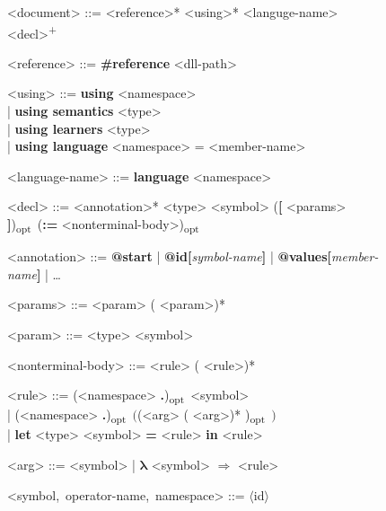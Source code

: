 \begin{figure}[p!]
    \begin{fullpage}
        \uwsinglespace
        \centering
        \newcommand{\onep}{\textsuperscript{+}}
        \newcommand{\optional}{\textsubscript{\textsf{opt}}\ }
        \renewcommand{\synt}[1]{\textsl{#1}}
        \renewcommand{\syntleft}{\slshape}
        \renewcommand{\syntright}{}
        \begin{tcolorbox}
            \begin{grammar}
                \parskip=3pt
                <document> ::= <reference>* <using>* <languge-name> <decl>\onep

                <reference> ::= \textbf{\#reference} <dll-path> \pmb{;}

                <using> ::= \textbf{using} <namespace> \pmb{;} \\
                | \textbf{using semantics} <type> \pmb{;} \\
                | \textbf{using learners} <type> \pmb{;} \\
                | \textbf{using language} <namespace> = <member-name> \pmb{;}

                <language-name> ::= \textbf{language} <namespace> \pmb{;}

                <decl> ::= <annotation>* <type> <symbol> (\textbf{[} <params> \textbf{]})\optional (\textbf{:=} <nonterminal-body>)\optional \pmb{;}

                <annotation> ::= \textbf{@start} | \textbf{@id[}\synt{symbol-name}\textbf{]} | \textbf{@values[}\synt{member-name}\textbf{]} | \dots

                <params> ::= <param> (\pmb{,} <param>)*

                <param> ::= <type> <symbol>

                <nonterminal-body> ::= <rule> (\pmb{|} <rule>)*

                <rule> ::= (<namespace> \textbf{.})\optional <symbol> \\
                | (<namespace> \textbf{.})\optional <operator-name>$\pmb{\bigl(}$(<arg> (\pmb{,} <arg>)* )\optional$\pmb{\bigr)}$ \\
                | \textbf{let} <type> <symbol> \textbf{=} <rule> \textbf{in} <rule>

                <arg> ::= <symbol> | $\bm{\lambda}$ <symbol> $\bm{\Rightarrow}$ <rule>

                <symbol,~operator-name,~namespace> ::= $\langle$\textup{id}$\rangle$


\end{grammar}
\end{tcolorbox}
\end{fullpage}
\end{figure}
